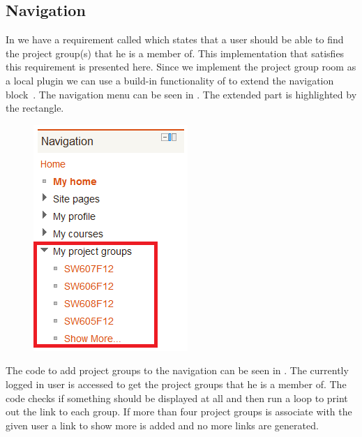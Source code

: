 \subsection{Navigation}
In  we have a requirement called  which states that a user should be able to find the project group(s) that he is a member of.
This implementation that satisfies this requirement is presented here.
Since we implement the project group room as a local plugin we can use a build-in functionality of \moodle{} to extend the navigation block~\cite{moodleextendnavigationblock}.
The navigation menu can be seen in .
The extended part is highlighted by the rectangle. 

\begin{figure}
	\centering
		\includegraphics[scale=0.7]{images/moodlenavigationblock.png}
	\label{fig:moodlenavigationblock}
\end{figure}

The code to add project groups to the navigation can be seen in .
The currently logged in user is accessed to get the project groups that he is a member of.
The code checks if something should be displayed at all and then run a loop to print out the link to each group. 
If more than four project groups is associate with the given user a link to show more is added and no more links are generated.


